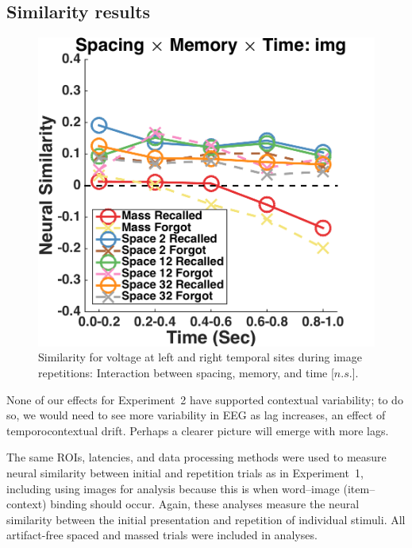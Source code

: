 \subsection{Similarity results}

\begin{figure}[H]
  \centering
  \includegraphics[width=.40\textwidth]{./figs/exp2/similarity_spacXmemXtime_img_tla_LTRT_0to200_200to400_400to600_600to800_800to1000_kaiser_cosine}
  \caption{Similarity for voltage at left and right temporal sites during image repetitions: Interaction between spacing, memory, and time [$n.s.$].}
  \label{fig:s2_sim_tla_spacXmemXtime}
\end{figure}


None of our effects for Experiment~2 have supported contextual variability; to do so, we would need to see more variability in EEG as lag increases, an effect of temporocontextual drift.
Perhaps a clearer picture will emerge with more lags.


The same ROIs, latencies, and data processing methods were used to measure neural similarity between initial and repetition trials as in Experiment~1, including using images for analysis because this is when word--image (item--context) binding should occur.  Again, these analyses measure the neural similarity between the initial presentation and repetition of individual stimuli.  All artifact-free spaced and massed trials were included in analyses.
 

